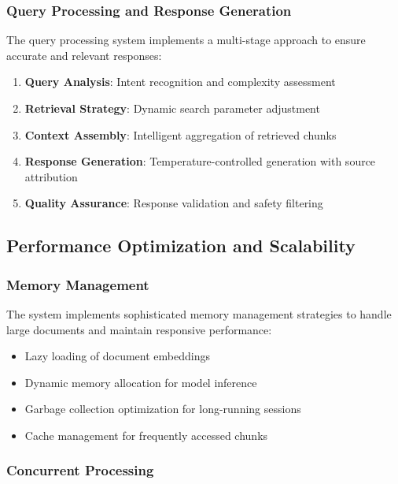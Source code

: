 \subsubsection{Query Processing and Response Generation}

The query processing system implements a multi-stage approach to ensure accurate and relevant responses:

\begin{enumerate}
    \item \textbf{Query Analysis}: Intent recognition and complexity assessment
    \item \textbf{Retrieval Strategy}: Dynamic search parameter adjustment
    \item \textbf{Context Assembly}: Intelligent aggregation of retrieved chunks
    \item \textbf{Response Generation}: Temperature-controlled generation with source attribution
    \item \textbf{Quality Assurance}: Response validation and safety filtering
\end{enumerate}

\subsection{Performance Optimization and Scalability}

\subsubsection{Memory Management}

The system implements sophisticated memory management strategies to handle large documents and maintain responsive performance:

\begin{itemize}
    \item Lazy loading of document embeddings
    \item Dynamic memory allocation for model inference
    \item Garbage collection optimization for long-running sessions
    \item Cache management for frequently accessed chunks
\end{itemize}

\subsubsection{Concurrent Processing}

